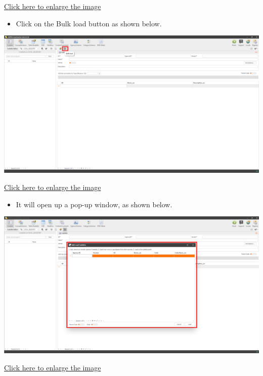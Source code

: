 \documentclass[
]{book}
\providecommand{\tightlist}{%
  \setlength{\itemsep}{0pt}\setlength{\parskip}{0pt}}
\begin{document}
\href{images/image082.png}{Click here to enlarge the image}

\begin{itemize}
\tightlist
\item
  Click on the Bulk load button as shown below.
\end{itemize}

\begin{center}\includegraphics[width=1\linewidth]{./images/image084} \end{center}

\href{images/image084.png}{Click here to enlarge the image}

\begin{itemize}
\tightlist
\item
  It will open up a pop-up window, as shown below.
\end{itemize}

\begin{center}\includegraphics[width=1\linewidth]{./images/image086} \end{center}

\href{images/image086.png}{Click here to enlarge the image}
\end{document}
